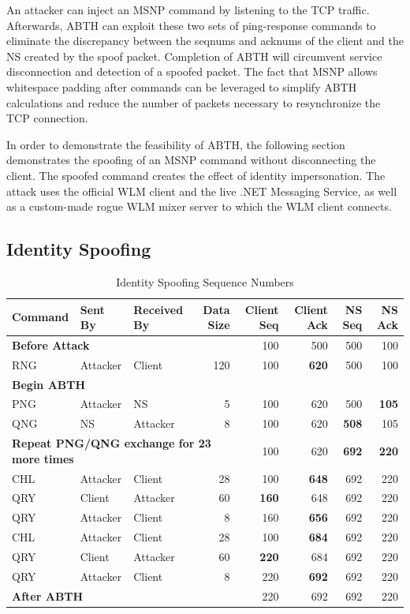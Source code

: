 \documentclass{sig-alternate}
\begin{document}
An attacker can inject an MSNP command by listening to the TCP traffic.
Afterwards, ABTH can exploit these two sets of ping-response commands to eliminate the discrepancy between the seqnums and acknums of the client and the NS created by the spoof packet.
Completion of ABTH will circumvent service disconnection and detection of a spoofed packet.
The fact that MSNP allows whitespace padding after commands can be leveraged to simplify ABTH calculations and reduce the number of packets necessary to resynchronize the TCP connection.

In order to demonstrate the feasibility of ABTH, the following section demonstrates the spoofing of an MSNP command without disconnecting the client.
The spoofed command creates the effect of identity impersonation.
The attack uses the official WLM client and the live .NET Messaging Service, as well as a custom-made rogue WLM mixer server to which the WLM client connects.

\subsection{Identity Spoofing}

\begin{table}[tbp]
	\centering

	\caption{Identity Spoofing Sequence Numbers}
	\label{tab:identityspoof}

	\begin{tabular}{l l l r r r r r}
		\hline
		\hline
		\textbf{Command} & \textbf{Sent By} & \textbf{Received By} & \textbf{Data Size} & \textbf{Client Seq} & \textbf{Client Ack} & \textbf{NS Seq} & \textbf{NS Ack} \\
		\hline
		\multicolumn{4}{l}{\textbf{Before Attack}} & 100 & 500 & 500 & 100 \\
		RNG & Attacker & Client & 120 & 100 & \textbf{620} & 500 & 100 \\
		\multicolumn{8}{l}{\textbf{Begin ABTH}} \\
		PNG & Attacker & NS & 5 & 100 & 620 & 500 & \textbf{105} \\
		QNG & NS & Attacker & 8 & 100 & 620 & \textbf{508} & 105 \\
		\multicolumn{4}{l}{\textbf{Repeat PNG/QNG exchange for 23 more times}} & 100 & 620 & \textbf{692} & \textbf{220} \\
		CHL & Attacker & Client & 28 & 100 & \textbf{648} & 692 & 220 \\
		QRY & Client & Attacker & 60 & \textbf{160} & 648 & 692 & 220 \\
		QRY & Attacker & Client & 8 & 160 & \textbf{656} & 692 & 220 \\
		CHL & Attacker & Client & 28 & 100 & \textbf{684} & 692 & 220 \\
		QRY & Client & Attacker & 60 & \textbf{220} & 684 & 692 & 220 \\
		QRY & Attacker & Client & 8 & 220 & \textbf{692} & 692 & 220 \\
		\hline
		\hline
		\multicolumn{4}{l}{\textbf{After ABTH}} & 220 & 692 & 692 & 220 \\
	\end{tabular}
\end{table}
\end{document}
